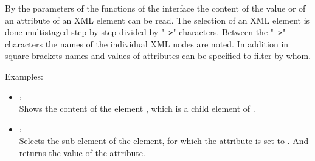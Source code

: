 By the parameters of the functions of the  interface the content of the
value or of an attribute of an XML element can be read.
The selection of an XML element is done multistaged step by step divided by
"\texttt{->}" characters. Between the "\texttt{->}" characters the names of the individual XML nodes are
noted. In addition in square brackets names and values of attributes can be specified to filter by whom.

Examples:

\begin{itemize}

\item
{}:\\
Shows the content of the element , which is a child element of .

\item
{}:\\
Selects the  sub element of the  element, for
which the  attribute is set to . And returns the value of the
 attribute.

\end{itemize}